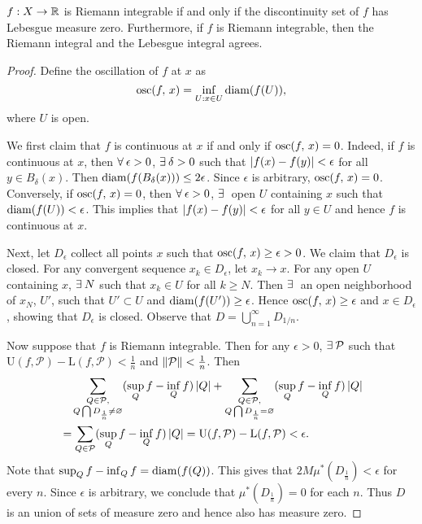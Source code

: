 \begin{theorem}
    $f:X\to\mathbb{R}$ is Riemann integrable if and only if the discontinuity 
    set of $f$ has Lebesgue measure zero. Furthermore, if $f$ is Riemann 
    integrable, then the Riemann integral and the Lebesgue integral agrees.
\end{theorem}
\begin{proof}
    Define the oscillation of $f$ at $x$ as 
    \begin{equation*}
        \osc{f}{x} = \inf_{U:x\in U} \diam{f(U)},
    \end{equation*}
    where $U$ is open. 
    
    We first claim that $f$ is continuous at $x$ if and only 
    if $\osc{f}{x}=0$. Indeed, if $f$ is continuous at $x$, 
    then $\forall\:\epsilon>0$, $\exists\:\delta>0$ such that 
    $\left\lvert {f(x)-f(y)} \right\rvert<\epsilon$ for all $y\in B_\delta(x)$. 
    Then $\diam{f(B_\delta(x))}\leq 2\epsilon$. Since 
    $\epsilon$ is arbitrary, $\osc{f}{x}=0$. Conversely, if 
    $\osc{f}{x}=0$, then $\forall\:\epsilon>0$, $\exists\:$ open 
    $U$ containing $x$ such that $\diam{f(U)}<\epsilon$. 
    This implies that $\left\lvert {f(x)-f(y)} \right\rvert<\epsilon$ for all 
    $y\in U$ and hence $f$ is continuous at $x$. 

    Next, let $D_\epsilon$ collect all points $x$ such that 
    $\osc{f}{x}\geq\epsilon>0$. We claim that $D_\epsilon$ 
    is closed. For any convergent sequence $x_k\in D_\epsilon$, 
    let $x_k\to x$. For any open $U$ containing $x$, $\exists\: N$ 
    such that $x_k\in U$ for all $k\geq N$. Then $\exists\:$ an 
    open neighborhood of $x_N$, $U'$, such that $U'\subset U$ 
    and $\diam{f(U')}\geq\epsilon$. Hence $\osc{f}{x}\geq
    \epsilon$ and $x\in D_\epsilon$, showing that $D_\epsilon$ 
    is closed. Observe that $D = \bigcup_{n=1}^{\infty}D_{1/n}$.
    
    Now suppose that $f$ is Riemann integrable. Then for any 
    $\epsilon>0$, $\exists\:\mathcal{P}$ such that $\mathrm{U}
    (f,\mathcal{P})-\mathrm{L}(f,\mathcal{P})<\frac{1}{n}$ and 
    $\left\lVert {\mathcal{P}} \right\rVert<\frac{1}{n}$. Then 
    \begin{equation*}
        \begin{split}
            &\quad\sum_{\substack{Q\in\mathcal{P},\\ Q\bigcap 
            D_\frac{1}{n}\neq\varnothing}} (\sup_Q f -\inf_Q f)\left\lvert {Q} \right\rvert 
            + \sum_{\substack{Q\in\mathcal{P}, \\ Q\bigcap 
            D_\frac{1}{n} = \varnothing}} (\sup_Q f -\inf_Q f)\left\lvert {Q} \right\rvert\\
            &= \sum_{Q\in\mathcal{P}}(\sup_Q f -\inf_Q f)\left\lvert {Q} \right\rvert 
            = \mathrm{U}(f,\mathcal{P})-\mathrm{L}(f,\mathcal{P}) 
            < \epsilon.
        \end{split}
    \end{equation*}
    Note that $\sup_Q f -\inf_Q f = \diam{f(Q)}$. This gives 
    that $2M\mu^*(D_\frac{1}{n})<\epsilon$ for every $n$. Since 
    $\epsilon$ is arbitrary, we conclude that $\mu^*(D_\frac{1}{n}) 
    = 0$ for each $n$. Thus $D$ is an union of sets of measure 
    zero and hence also has measure zero. 


\end{proof}
